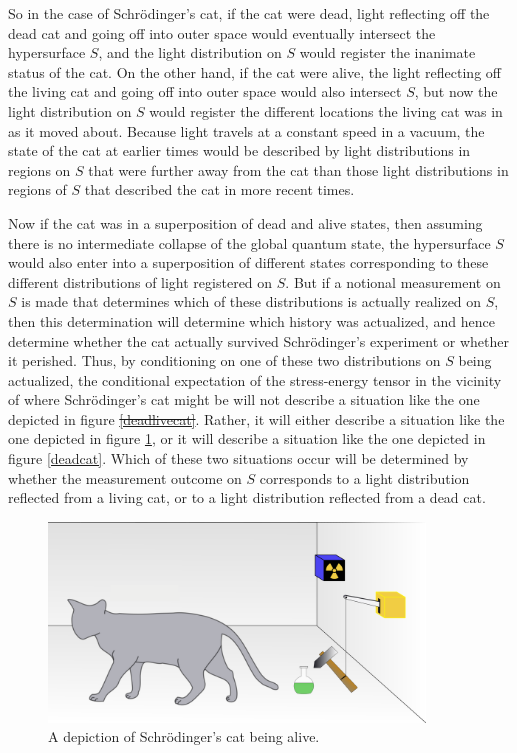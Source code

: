 \documentclass[12pt]{report}
\providecommand{\DIFadd}[1]{{\protect\color{blue}\uwave{#1}}} %
\providecommand{\DIFdel}[1]{{\protect\color{red}\sout{#1}}}                      %
\providecommand{\DIFaddbegin}{} %
\providecommand{\DIFaddend}{} %
\providecommand{\DIFdelbegin}{} %
\providecommand{\DIFdelend}{} %
\providecommand{\DIFaddbeginFL}{} %
\providecommand{\DIFaddendFL}{} %
\providecommand{\DIFdelbeginFL}{} %
\providecommand{\DIFdelendFL}{} %
\begin{document}
So in the case of Schr\"{o}dinger's cat, if the cat were dead,  light reflecting off the dead cat and going off into outer space would eventually intersect the hypersurface $S$, and the light distribution on $S$ would register the inanimate status of the cat. On the other hand, if the cat were alive, the light reflecting off the living cat and going off into outer space would also intersect $S$, but now the light distribution on $S$ would register the different locations the living cat was in as it moved about. Because light travels at a constant speed in a vacuum, the state of the cat at earlier times would be described by light distributions in regions on $S$ that were further away from the cat than those light distributions in regions of $S$ that described the cat in more recent times. 

Now if the cat was in a superposition of dead and alive states, then assuming there is no intermediate collapse of the global quantum state,  the hypersurface $S$ would also enter into a superposition of different states corresponding to these different distributions of light registered on $S$. But if a notional measurement on $S$ is made that determines which of these distributions is actually realized on $S$, then this determination will determine which history was actualized, and hence determine whether the cat actually survived Schr\"{o}dinger's experiment or whether it perished.   Thus, by conditioning on one of these two distributions on $S$ being actualized, the conditional expectation of the stress-energy tensor in the vicinity of where Schr\"{o}dinger's cat might be 
will not describe a situation like the one depicted in figure \DIFdelbegin \DIFdel{\ref{deadlivecat}}\DIFdelend \DIFaddbegin \DIFadd{\ref{deadlivecat2}}\DIFaddend .   Rather, it will either describe a situation like the one depicted in figure \ref{livecat}, or it will describe a situation like the one depicted in figure \ref{deadcat}. Which of these two situations occur will be determined by whether the measurement outcome on $S$ corresponds to a light distribution reflected from a living cat, or to a light distribution reflected from a dead cat. 
\begin{figure}[ht!]
  \captionsetup{justification=justified}
  \centering
  \includegraphics[width=100mm]{Chapter03/Schrodingers_livecat.png}
  \DIFdelbeginFL %
\DIFdelendFL \DIFaddbeginFL \caption[Depiction of Schr\"{o}dinger's living cat]{\DIFaddendFL A depiction of Schr\"{o}dinger's cat being alive.\protect\footnotemark}
  \label{livecat}
  \end{figure}
\end{document}
